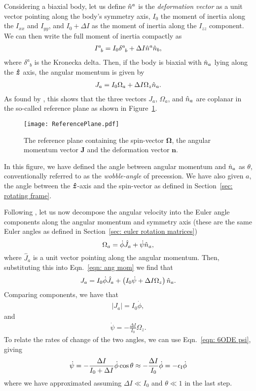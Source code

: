 \documentclass[../full_thesis/full_thesis.tex]{subfiles}
\begin{document}
Considering a biaxial body, let us define $\hat{n}^a$ is the \emph{deformation
vector} as a unit vector pointing along the body's symmetry axis, $I_0$ the
moment of inertia along the $I_{xx}$ and $I_{yy}$, and $I_{0} + \Delta I$
as the moment of inertia along the $I_{zz}$ component. We can then write the
full moment of inertia compactly as
\begin{align}
I^{a}_{\;\;b} = I_{0} \delta^{a}_{\;\;b} + \Delta I \hat{n}^a \hat{n}_b,
\end{align}
where $\delta^{a}_{\;\;b}$ is the Kronecka delta. Then, if the body is biaxial with $\hat{n}_{a}$ lying along
the $\boldsymbol{\hat{z}}$ axis, the angular momentum is given by
\begin{align}
J_{a} = I_0 \Omega_a + \Delta I \Omega_z \hat{n}_a.
\label{eqn: ang mom}
\end{align}
As found by \citet{Pines1972}, this shows that the three vectors $J_a$,
$\Omega_a$, and $\hat{n}_a$ are coplanar in the so-called reference plane as shown in
Figure~\ref{fig: reference plane}.
\begin{figure}[htb]
    \texttt{[image: ReferencePlane.pdf]}
    \caption{The reference plane containing the spin-vector $\mathbf{\Omega}$,
    the angular momentum vector $\mathbf{J}$ and the deformation vector $\mathbf{n}$.}
    \label{fig: reference plane}
\end{figure}
In this figure, we have defined the angle between angular momentum and $\hat{n}_a$ as
$\theta$, conventionally referred to as the \emph{wobble-angle} of
precession. We have also given $a$, the angle between the $\boldsymbol{\hat{z}}$-axis and the
spin-vector as defined in Section~\ref{sec: rotating frame}.

Following \citet{Jones2001}, let us now decompose the angular velocity into the
Euler angle components along the angular momentum and symmetry axis (these
are the same Euler angles as defined in Section~\ref{sec: euler rotation
matrices})
\begin{equation}
  \Omega_a = \dot{\phi}\hat{J}_a + \dot{\psi}\hat{n}_{a},
\label{eqn: decomp}
\end{equation}
where $\hat{J}_a$ is a unit vector pointing along the angular momentum. Then,
substituting this into Eqn.~\eqref{eqn: ang mom} we find that
\begin{align}
J_a = I_0 \dot{\phi} \hat{J}_a + \left(I_0 \dot{\psi} + \Delta I \Omega_z\right)\hat{n}_a.
\end{align}
Comparing components, we have that
\begin{align}
|J_a| = I_0 \dot{\phi},
\end{align}
and
\begin{align}
\dot{\psi} = -\frac{\Delta I}{I_0} \Omega_z.
\end{align}
To relate the rates of change of the two angles, we can use Eqn.~\eqref{eqn:
6ODE psi}, giving
\begin{align}
\dot{\psi} = - \frac{\Delta I}{I_0 + \Delta I} \dot{\phi} \cos\theta
\approx -\frac{\Delta I}{I_0} \dot{\phi} = -\epsilon_{\mathrm{I}} \dot{\phi}
\label{eqn: psi phi}
\end{align}
where we have approximated assuming $\Delta I \ll I_0$ and $\theta \ll 1$ in
the last step.
\end{document}
